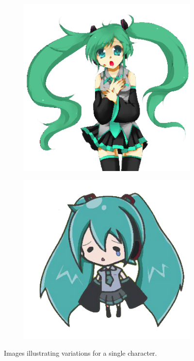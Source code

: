 \documentclass{beamer}
\begin{document}
\begin{frame}
\begin{figure}[htb!]
\begin{subfigure}{.3\textwidth}
\end{subfigure}
\begin{subfigure}{.3\textwidth}
\includegraphics[width=\textwidth]{../images/miku_c.png}
\end{subfigure}
\begin{subfigure}{.3\textwidth}
\includegraphics[width=\textwidth]{../images/miku_d.png}
\end{subfigure}
\caption{Images illustrating variations for a single character.}
\label{fig:animationImagesVariations}
\end{figure}

\end{frame}
\end{document}
